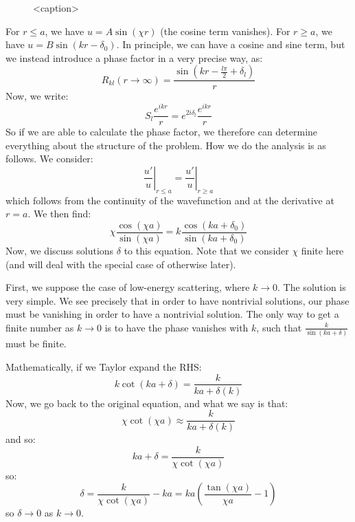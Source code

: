 \begin{figure}[htbp]
    \centering
    
    \caption{<caption>}
    \label{<label>}
\end{figure}

For $r \leq a$, we have $u = A\sin(\chi r)$ (the cosine term vanishes). For $r \geq a$, we have $u = B\sin(kr - \delta_0)$. In principle, we can have a cosine and sine term, but we instead introduce a phase factor in a very precise way, as:
\begin{equation}
    R_{kl}(r \to \infty) = \frac{\sin(kr - \frac{l\pi}{2} + \delta_l)}{r}
\end{equation}
Now, we write:
\begin{equation}
    S_l \frac{e^{ikr}}{r} = e^{2i\delta_l}\frac{e^{ikr}}{r}
\end{equation}
So if we are able to calculate the phase factor, we therefore can determine everything about the structure of the problem. How we do the analysis is as follows. We consider:
\begin{equation}
    \left. \frac{u'}{u}\right|_{r \leq a} = \left. \frac{u'}{u}\right|_{r \geq a}
\end{equation}
which follows from the continuity of the wavefunction and at the derivative at $r = a$. We then find:
\begin{equation}
    \chi \frac{\cos(\chi a)}{\sin(\chi a)} = k\frac{\cos(ka + \delta_0)}{\sin(ka + \delta_0)}
\end{equation}
Now, we discuss solutions $\delta$ to this equation. Note that we consider $\chi$ finite here (and will deal with the special case of otherwise later).

First, we suppose the case of low-energy scattering, where $k \to 0$. The solution is very simple. We see precisely that in order to have nontrivial solutions, our phase must be vanishing in order to have a nontrivial solution. The only way to get a finite number as $k \to 0$ is to have the phase vanishes with $k$, such that $\frac{k}{\sin(ka + \delta)}$ must be finite.


Mathematically, if we Taylor expand the RHS:
\begin{equation}
    k\cot(ka + \delta) = \frac{k}{ka + \delta(k)}
\end{equation}
Now, we go back to the original equation, and what we say is that:
\begin{equation}
    \chi\cot(\chi a) \approx \frac{k}{ka + \delta(k)}
\end{equation}
and so:
\begin{equation}
    ka + \delta = \frac{k}{\chi\cot(\chi a)}
\end{equation}
so:
\begin{equation}
    \delta = \frac{k}{\chi\cot(\chi a)} - ka = ka\left(\frac{\tan(\chi a)}{\chi a} - 1\right)
\end{equation}
so $\delta \to 0$ as $k \to 0$. 

